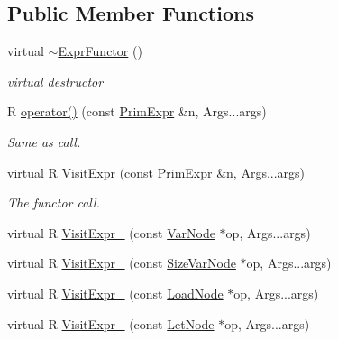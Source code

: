 \subsection*{Public Member Functions}
\begin{DoxyCompactItemize}
\item 
virtual \hyperlink{classtvm_1_1tir_1_1ExprFunctor_3_01R_07const_01PrimExpr_01_6n_00_01Args_8_8_8_08_4_a463951999eb3aa125880d5b6aa1f9191}{$\sim$\+Expr\+Functor} ()
\begin{DoxyCompactList}\small\item\em virtual destructor \end{DoxyCompactList}\item 
R \hyperlink{classtvm_1_1tir_1_1ExprFunctor_3_01R_07const_01PrimExpr_01_6n_00_01Args_8_8_8_08_4_aac076394dd79bf1b270b3ac66049ce6a}{operator()} (const \hyperlink{classtvm_1_1PrimExpr}{Prim\+Expr} \&n, Args...\+args)
\begin{DoxyCompactList}\small\item\em Same as call. \end{DoxyCompactList}\item 
virtual R \hyperlink{classtvm_1_1tir_1_1ExprFunctor_3_01R_07const_01PrimExpr_01_6n_00_01Args_8_8_8_08_4_ae8fabc4d8506e5f8482b6bead499826c}{Visit\+Expr} (const \hyperlink{classtvm_1_1PrimExpr}{Prim\+Expr} \&n, Args...\+args)
\begin{DoxyCompactList}\small\item\em The functor call. \end{DoxyCompactList}\item 
virtual R \hyperlink{classtvm_1_1tir_1_1ExprFunctor_3_01R_07const_01PrimExpr_01_6n_00_01Args_8_8_8_08_4_ad3aaa39ac98e4c0dd0992db2fba817bb}{Visit\+Expr\+\_\+} (const \hyperlink{classtvm_1_1tir_1_1VarNode}{Var\+Node} $\ast$op, Args...\+args)
\item 
virtual R \hyperlink{classtvm_1_1tir_1_1ExprFunctor_3_01R_07const_01PrimExpr_01_6n_00_01Args_8_8_8_08_4_a2f91deba0c87b4e472518e9dfeb1e3a4}{Visit\+Expr\+\_\+} (const \hyperlink{classtvm_1_1tir_1_1SizeVarNode}{Size\+Var\+Node} $\ast$op, Args...\+args)
\item 
virtual R \hyperlink{classtvm_1_1tir_1_1ExprFunctor_3_01R_07const_01PrimExpr_01_6n_00_01Args_8_8_8_08_4_a8eb9beccd3fe39bc7b174ab523e3d65b}{Visit\+Expr\+\_\+} (const \hyperlink{classtvm_1_1tir_1_1LoadNode}{Load\+Node} $\ast$op, Args...\+args)
\item 
virtual R \hyperlink{classtvm_1_1tir_1_1ExprFunctor_3_01R_07const_01PrimExpr_01_6n_00_01Args_8_8_8_08_4_a05a38114dfddfd40fea45cdbff6a57d7}{Visit\+Expr\+\_\+} (const \hyperlink{classtvm_1_1tir_1_1LetNode}{Let\+Node} $\ast$op, Args...\+args)

\end{DoxyCompactItemize}
